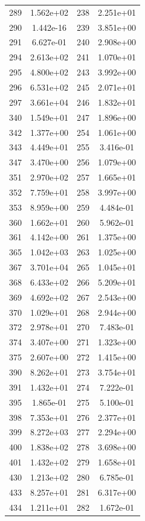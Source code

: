 \documentclass[12pt]{article}
\begin{document}
\begin{longtable}{@{}cccc@{}}
289 & 1.562e+02 & 238 & 2.251e+01 \\
290 & 1.442e-16 & 239 & 3.851e+00 \\
291 & 6.627e-01 & 240 & 2.908e+00 \\
294 & 2.613e+02 & 241 & 1.070e+01 \\
295 & 4.800e+02 & 243 & 3.992e+00 \\
296 & 6.531e+02 & 245 & 2.071e+01 \\
297 & 3.661e+04 & 246 & 1.832e+01 \\
340 & 1.549e+01 & 247 & 1.896e+00 \\
342 & 1.377e+00 & 254 & 1.061e+00 \\
343 & 4.449e+01 & 255 & 3.416e-01 \\
347 & 3.470e+00 & 256 & 1.079e+00 \\
351 & 2.970e+02 & 257 & 1.665e+01 \\
352 & 7.759e+01 & 258 & 3.997e+00 \\
353 & 8.959e+00 & 259 & 4.484e-01 \\
360 & 1.662e+01 & 260 & 5.962e-01 \\
361 & 4.142e+00 & 261 & 1.375e+00 \\
365 & 1.042e+03 & 263 & 1.025e+00 \\
367 & 3.701e+04 & 265 & 1.045e+01 \\
368 & 6.433e+02 & 266 & 5.209e+01 \\
369 & 4.692e+02 & 267 & 2.543e+00 \\
370 & 1.029e+01 & 268 & 2.944e+00 \\
372 & 2.978e+01 & 270 & 7.483e-01 \\
374 & 3.407e+00 & 271 & 1.323e+00 \\
375 & 2.607e+00 & 272 & 1.415e+00 \\
390 & 8.262e+01 & 273 & 3.754e+01 \\
391 & 1.432e+01 & 274 & 7.222e-01 \\
395 & 1.865e-01 & 275 & 5.100e-01 \\
398 & 7.353e+01 & 276 & 2.377e+01 \\
399 & 8.272e+03 & 277 & 2.294e+00 \\
400 & 1.838e+02 & 278 & 3.698e+00 \\
401 & 1.432e+02 & 279 & 1.658e+01 \\
430 & 1.213e+02 & 280 & 6.785e-01 \\
433 & 8.257e+01 & 281 & 6.317e+00 \\
434 & 1.211e+01 & 282 & 1.672e-01 \\

\end{longtable}
\end{document}
